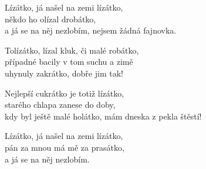  

\noindent{}Lízátko, já našel na zemi lízátko,\\
někdo ho olízal drobátko,\\
a já se na něj  nezlobím, nejsem žádná fajnovka.\vspace{20pt}

\noindent Tolízátko, lízal kluk, či malé robátko,\\
případné bacily v tom suchu a zimě\\
uhynuly zakrátko, dobře jim tak!\vspace{20pt}
	
\noindent Nejlepší cukrátko je totiž lízátko,\\
starého chlapa zanese do doby,\\
kdy byl ještě malé holátko, mám dneska z pekla štěstí!\vspace{20pt}

\noindent{}Lízátko, já našel na zemi lízátko,\\
pán za mnou má mě za prasátko,\\
a já se na něj nezlobím. \nc{}
\newpage
